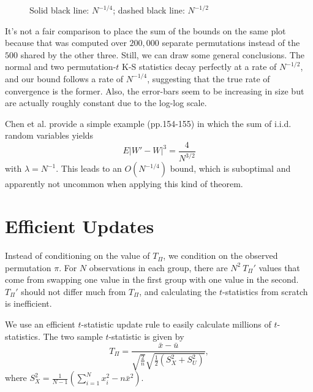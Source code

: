 \begin{figure}[!ht]
  \centering
  
  \caption{Solid black line: $N^{-1/4}$; dashed black line: $N^{-1/2}$}
\end{figure}

It's not a fair comparison to place the sum of the bounds on the same plot because that was computed
over $200,000$ separate permutations instead of the $500$ shared by the other three.  Still, we can
draw some general conclusions.  The normal and two permutation-$t$ K-S statistics decay perfectly at
a rate of $N^{-1/2}$, and our bound follows a rate of $N^{-1/4}$, suggesting that the true rate of
convergence is the former.  Also, the error-bars seem to be increasing in size but are actually
roughly constant due to the log-log scale.

Chen et al. \cite{chen2010normal} provide a simple example
(pp.154-155) in which the sum of i.i.d. random variables yields
\begin{equation*}
  E|W' - W|^3 = \frac{4}{N^{3/2}}
\end{equation*}
with $\lambda = N^{-1}$.  This leads to an $O(N^{-1/4})$ bound, which is suboptimal and apparently
not uncommon when applying this kind of theorem.

\section{Efficient Updates}
Instead of conditioning on the value of $T_{\Pi}$, we condition on the
observed permutation $\pi$.  For $N$ observations in each group, there
are $N^2 \: T_{\Pi}'$ values that come from swapping one value in the first
group with one value in the second.  $T_{\Pi}'$ should not differ much from
$T_{\Pi}$, and calculating the $t$-statistics from scratch is inefficient.

We use an efficient $t$-statistic update rule to easily calculate
millions of $t$-statistics.  The two sample $t$-statistic is given by
\begin{equation*}
  T_{\Pi} = \frac{\bar{x}-\bar{u}}
  {\sqrt{\frac{2}{n}}\sqrt{\frac{1}{2}(S_X^2+S_U^2)}},
\end{equation*}
where $S_X^2=\frac{1}{N-1}(\sum_{i=1}^Nx_i^2-n\bar{x}^2)$.

